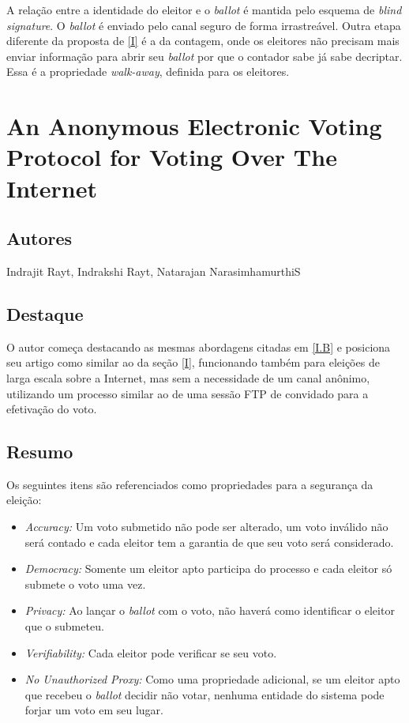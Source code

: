 \documentclass[letterpaper, 12 pt, conference]{ieeeconf}
\begin{document}
        A relação entre a identidade do eleitor e o \textit{ballot} é mantida pelo esquema de \textit{blind signature}. O \textit{ballot} é enviado pelo canal seguro de forma irrastreável. Outra etapa diferente da proposta de \ref{I} é a  da contagem, onde os eleitores não precisam mais enviar informação para abrir seu \textit{ballot} por que o contador sabe já sabe decriptar. Essa é a propriedade \textit{walk-away}, definida para os eleitores.
        
\section{An Anonymous Electronic Voting Protocol for Voting Over The Internet}
    \subsection{Autores}
        Indrajit Rayt, Indrakshi Rayt, Natarajan NarasimhamurthiS
    \subsection{Destaque}
        O autor começa destacando as mesmas abordagens citadas em \ref{I.B} e posiciona seu artigo como similar ao da seção \ref{I}, funcionando também para eleições de larga escala sobre a Internet, mas sem a necessidade de um canal anônimo, utilizando um processo similar ao de uma sessão FTP de convidado para a efetivação do voto.
    \subsection{Resumo}
        Os seguintes itens são referenciados como propriedades para a segurança da eleição:
        \begin{itemize}
            \item \textit{Accuracy:}
                Um voto submetido não pode ser alterado, um voto inválido não será contado e cada eleitor tem a garantia de que seu voto será considerado.
            \item \textit{Democracy:}
                Somente um eleitor apto participa do processo e cada eleitor só submete o voto uma vez.
            \item \textit{Privacy:}
                Ao lançar o \textit{ballot} com o voto, não haverá como identificar o eleitor que o submeteu.
            \item \textit{Verifiability:}
                Cada eleitor pode verificar se seu voto.
            \item \textit{No Unauthorized Proxy:}
                Como uma propriedade adicional, se um eleitor apto que recebeu o \textit{ballot} decidir não votar, nenhuma entidade do sistema pode forjar um voto em seu lugar.
        \end{itemize}
        
\end{document}
